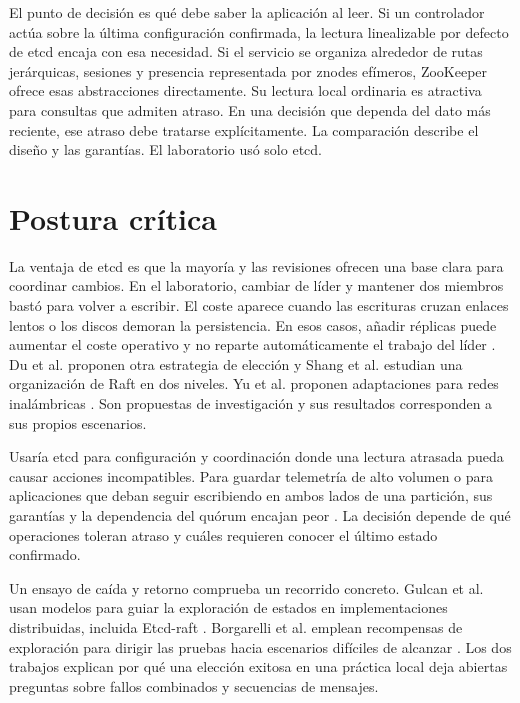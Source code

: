 \documentclass[11pt,a4paper]{article}
\begin{document}
El punto de decisión es qué debe saber la aplicación al leer. Si un controlador actúa sobre la última configuración confirmada, la lectura linealizable por defecto de etcd encaja con esa necesidad. Si el servicio se organiza alrededor de rutas jerárquicas, sesiones y presencia representada por znodes efímeros, ZooKeeper ofrece esas abstracciones directamente. Su lectura local ordinaria es atractiva para consultas que admiten atraso. En una decisión que dependa del dato más reciente, ese atraso debe tratarse explícitamente. La comparación describe el diseño y las garantías. El laboratorio usó solo etcd.

\section{Postura crítica}
La ventaja de etcd es que la mayoría y las revisiones ofrecen una base clara para coordinar cambios. En el laboratorio, cambiar de líder y mantener dos miembros bastó para volver a escribir. El coste aparece cuando las escrituras cruzan enlaces lentos o los discos demoran la persistencia. En esos casos, añadir réplicas puede aumentar el coste operativo y no reparte automáticamente el trabajo del líder \cite{etcdfaq}. Du et al. proponen otra estrategia de elección y Shang et al. estudian una organización de Raft en dos niveles. Yu et al. proponen adaptaciones para redes inalámbricas \cite{du2023leader,shang2025draft,yu2024adaptive}. Son propuestas de investigación y sus resultados corresponden a sus propios escenarios.

Usaría etcd para configuración y coordinación donde una lectura atrasada pueda causar acciones incompatibles. Para guardar telemetría de alto volumen o para aplicaciones que deban seguir escribiendo en ambos lados de una partición, sus garantías y la dependencia del quórum encajan peor \cite{etcdfaq,etcdgar}. La decisión depende de qué operaciones toleran atraso y cuáles requieren conocer el último estado confirmado.

Un ensayo de caída y retorno comprueba un recorrido concreto. Gulcan et al. usan modelos para guiar la exploración de estados en implementaciones distribuidas, incluida Etcd-raft \cite{gulcan2025modelfuzz}. Borgarelli et al. emplean recompensas de exploración para dirigir las pruebas hacia escenarios difíciles de alcanzar \cite{borgarelli2024reward}. Los dos trabajos explican por qué una elección exitosa en una práctica local deja abiertas preguntas sobre fallos combinados y secuencias de mensajes.
\end{document}
